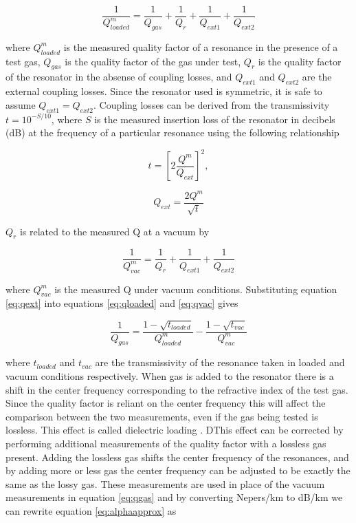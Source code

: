 \begin{equation} \label{eq:qloaded}
\frac{1}{Q_{loaded}^m} = \frac{1}{Q_{gas}} + \frac{1}{Q_{r}} + \frac{1}{Q_{ext1}} +\frac{1}{Q_{ext2}}
\end{equation}

\noindent where $Q_{loaded}^m$ is the measured quality factor of a resonance in the presence of a test gas, $Q_{gas}$ is the quality factor of the gas under test, $Q_{r}$ is the quality factor of the resonator in the absense of coupling losses, and $Q_{ext1}$ and $Q_{ext2}$ are the external coupling losses. Since the resonator used is symmetric, it is safe to assume $Q_{ext1} = Q_{ext2}$. Coupling losses can be derived from the transmissivity $t = 10^{-S/10}$, where $S$ is the measured insertion loss of the resonator in decibels (dB) at the frequency of a particular resonance using the following relationship \cite{Matthael-1980}

\begin{equation} \label{eq:t}
t = \left[ 2 \frac{Q^m}{Q_{ext}} \right]^2,
\end{equation}

\begin{equation} \label{eq:qext}
Q_{ext} = \frac{2Q^m}{\sqrt{t}}
\end{equation}

\noindent $Q_r$ is related to the measured Q at a vacuum by

\begin{equation}\label{eq:qvac}
\frac{1}{Q_{vac}^m} =  \frac{1}{Q_{r}} + \frac{1}{Q_{ext1}} +\frac{1}{Q_{ext2}}
\end{equation}

\noindent where $Q_{vac}^m$ is the measured Q under vacuum conditions. Substituting equation \ref{eq:qext} into equations \ref{eq:qloaded} and \ref{eq:qvac} gives

\begin{equation}\label{eq:qgas}
\frac{1}{Q_{gas}} = \frac{1 - \sqrt{t_{loaded}}}{Q^m_{loaded}} - \frac{1-\sqrt{t_{vac}}}{Q_{vac}^m}
\end{equation}

\noindent where $t_{loaded}$ and $t_{vac}$ are the transmissivity of the resonance taken in loaded and vacuum conditions respectively. When gas is added to the resonator there is a shift in the center frequency corresponding to the refractive index of the test gas. Since the quality factor is reliant on the center frequency this will affect the comparison between the two measurements, even if the gas being tested is lossless. This effect is called dielectric loading \cite{Deboer-1993}. DThis effect can be corrected by performing additional measurements of the quality factor with a lossless gas present. Adding the lossless gas shifts the center frequency of the resonances, and by adding more or less gas the center frequency can be adjusted to be exactly the same as the lossy gas. These measurements are used in place of the vacuum measurements in equation \ref{eq:qgas} and by converting Nepers/km to dB/km we can rewrite equation \ref{eq:alphaapprox} as

